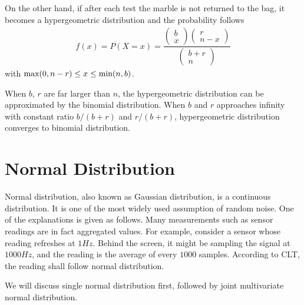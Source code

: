 On the other hand, if after each test the marble is not returned to the bag, it becomes a hypergeometric distribution and the probability follows
\begin{eqnarray}
f(x) = P(X=x) = \dfrac{\left(\begin{array}{c}
                               b \\
                               x
                             \end{array}\right)\left(\begin{array}{c}
                                                       r \\
                                                       n-x
                                                     \end{array}\right)}{\left(\begin{array}{c}
                                                                                 b+r \\
                                                                                 n
                                                                               \end{array}\right)} \nonumber
\end{eqnarray}
with $\textup{max}(0, n-r) \leq x \leq \textup{min}(n, b)$.

When $b$, $r$ are far larger than $n$, the hypergeometric distribution can be approximated by the binomial distribution. When $b$ and $r$ approaches infinity with constant ratio $b/(b+r)$ and $r/(b+r)$, hypergeometric distribution converges to binomial distribution.

\section{Normal Distribution}

Normal distribution, also known as Gaussian distribution, is a continuous distribution. It is one of the most widely used assumption of random noise. One of the explanations is given as follows. Many measurements such as sensor readings are in fact aggregated values. For example, consider a sensor whose reading refreshes at $1Hz$. Behind the screen, it might be sampling the signal at $1000Hz$, and the reading is the average of every $1000$ samples. According to CLT, the reading shall follow normal distribution.

We will discuss single normal distribution first, followed by joint multivariate normal distribution.

